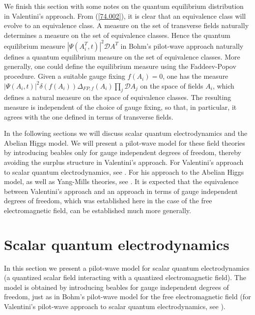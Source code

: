\documentclass[12pt]{article}
\begin{document}
We finish this section with some notes on the quantum equilibrium distribution in Valentini's approach. From ({\ref{74.002}}), it is clear that an equivalence class will evolve to an equivalence class. A measure on the set of transverse fields naturally determines a measure on the set of equivalence classes. Hence the quantum equilibrium measure $|\Psi(A^T_i,t)|^2 {\mathcal D} A^T$ in Bohm's pilot-wave approach naturally defines a quantum equilibrium measure on the set of equivalence classes. More generally, one could define the equilibrium measure using the Faddeev-Popov procedure. Given a suitable gauge fixing $f(A_i)=0$, one has the measure $|\Psi(A_i,t)|^2 \delta (f(A_i)) \Delta_{FP,f}(A_i) \prod_j{\mathcal D} A_j$ on the space of fields $A_i$, which defines a natural measure on the space of equivalence classes. The resulting measure is independent of the choice of gauge fixing, so that, in particular, it agrees with the one defined in terms of transverse fields. 

In the following sections we will discuss scalar quantum electrodynamics and the Abelian Higgs model. We will present a pilot-wave model for these field theories by introducing beables only for gauge independent degrees of freedom, thereby avoiding the surplus structure in Valentini's approach. For Valentini's approach to scalar quantum electrodynamics, see \cite{valentini92}. For his approach to the Abelian Higgs model, as well as Yang-Mills theories, see \cite{valentini09}. It is expected that the equivalence between Valentini's approach and an approach in terms of gauge independent degrees of freedom, which was established here in the case of the free electromagnetic field, can be established much more generally. 




\section{Scalar quantum electrodynamics}\label{scalarqed}
In this section we present a pilot-wave model for scalar quantum electrodynamics (a quantized scalar field interacting with a quantized electromagnetic field). The model is obtained by introducing beables for gauge independent degrees of freedom, just as in Bohm's pilot-wave model for the free electromagnetic field (for Valentini's pilot-wave approach to scalar quantum electrodynamics, see \cite{valentini92}).
\end{document}
